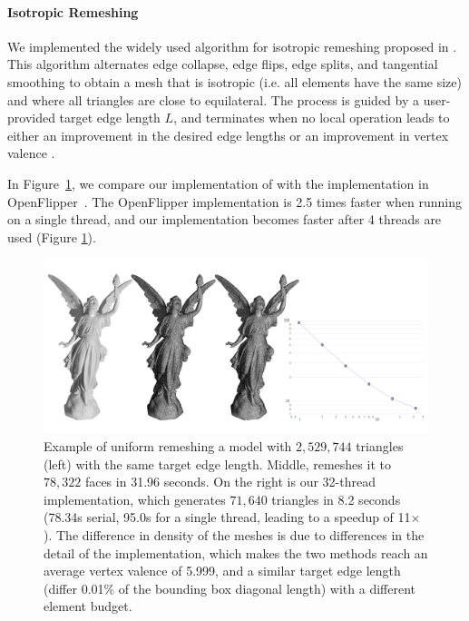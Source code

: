 \paragraph{Isotropic Remeshing}

We implemented the {widely used} algorithm for isotropic remeshing proposed in \cite{botsch2004remeshing}. This algorithm alternates edge collapse, edge flips, edge splits, and tangential smoothing to obtain a mesh that is isotropic (i.e. all elements have the same size) and where all triangles are close to equilateral. The process is guided by a user-provided target edge length $L$, and terminates when no local operation leads to either an improvement in the desired edge lengths or an improvement in vertex valence \cite{botsch2004remeshing}.

In Figure~\ref{fig:uniform}, we compare our implementation of \cite{botsch2004remeshing} with the implementation in OpenFlipper~\cite{mobius2010openflipper}.
The OpenFlipper implementation is 2.5 times faster when running on a single thread, and our implementation becomes faster after 4 threads are used (Figure \ref{fig:uniform}).

\begin{figure}
    \centering\footnotesize
    \includegraphics[width=\linewidth]{wmtk-tex/figs/2d-remeshing-lucy.pdf}
    \caption{Example of uniform remeshing a model with $2,529,744$ triangles (left) with the same target edge length. Middle, \cite{mobius2010openflipper} remeshes it to $78,322$ faces in 31.96 seconds. On the right is our
    32-thread implementation, which generates $71,640$ triangles in 8.2 seconds (78.34s serial, 95.0s for a single thread, leading to a speedup of 11$\times$). The difference in density of the meshes is due to differences in the detail of the implementation, which makes the two methods reach an average vertex valence of 5.999, and a similar target edge length (differ 0.01\% of the bounding box diagonal length) with a different element budget.}
    \label{fig:uniform}
    
    
\end{figure}


